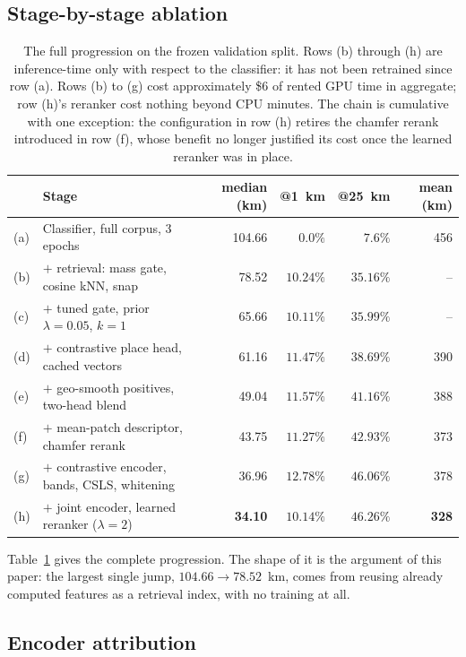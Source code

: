 \documentclass[11pt,a4paper]{article}
\begin{document}
\subsection{Stage-by-stage ablation}

\begin{table}[t]
\centering
\footnotesize
\begin{tabular}{llrrrr}
\toprule
& Stage & median (km) & @1~km & @25~km & mean (km) \\
\midrule
(a) & Classifier, full corpus, 3 epochs & 104.66 & $0.0\%$ & $7.6\%$ & 456 \\
(b) & \quad $+$ retrieval: mass gate, cosine kNN, snap & 78.52 & $10.24\%$ & $35.16\%$ & -- \\
(c) & \quad $+$ tuned gate, prior $\lambda{=}0.05$, $k{=}1$ & 65.66 & $10.11\%$ & $35.99\%$ & -- \\
(d) & \quad $+$ contrastive place head, cached vectors & 61.16 & $11.47\%$ & $38.69\%$ & 390 \\
(e) & \quad $+$ geo-smooth positives, two-head blend & 49.04 & $11.57\%$ & $41.16\%$ & 388 \\
(f) & \quad $+$ mean-patch descriptor, chamfer rerank & 43.75 & $11.27\%$ & $42.93\%$ & 373 \\
(g) & \quad $+$ contrastive encoder, bands, CSLS, whitening & 36.96 & $12.78\%$ & $46.06\%$ & 378 \\
(h) & \quad $+$ joint encoder, learned reranker ($\lambda{=}2$) & \textbf{34.10} & $10.14\%$ & $\mathbf{46.26\%}$ & \textbf{328} \\
\bottomrule
\end{tabular}
\caption{The full progression on the frozen validation split. Rows (b) through (h) are
inference-time only with respect to the classifier: it has not been retrained since row (a).
Rows (b) to (g) cost approximately \$6 of rented GPU time in aggregate; row (h)'s reranker
cost nothing beyond CPU minutes. The chain is cumulative with one exception: the
configuration in row (h) retires the chamfer rerank introduced in row (f), whose benefit no
longer justified its cost once the learned reranker was in place.}
\label{tab:progression}
\end{table}

Table~\ref{tab:progression} gives the complete progression. The shape of it is the argument of
this paper: the largest single jump, $104.66 \rightarrow 78.52$~km, comes from reusing already
computed features as a retrieval index, with no training at all.

\subsection{Encoder attribution}
\label{sec:attribution}
\end{document}
